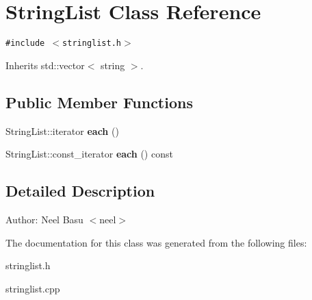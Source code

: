 \section{StringList Class Reference}
\label{classStringList}
{\tt \#include $<$stringlist.h$>$}

Inherits std::vector$<$ string $>$.

\subsection*{Public Member Functions}
\begin{CompactItemize}
\item 
StringList::iterator \textbf{each} ()\label{classStringList_efefd2584f7b22d9fe896f6aacb4c0d4}

\item 
StringList::const\_\-iterator \textbf{each} () const \label{classStringList_3c607062896de566f918b3c5480dd8ac}

\end{CompactItemize}


\subsection{Detailed Description}
\begin{Desc}
\item[Author:]Neel Basu $<$neel$>$ \end{Desc}


The documentation for this class was generated from the following files:\begin{CompactItemize}
\item 
stringlist.h\item 
stringlist.cpp\end{CompactItemize}
